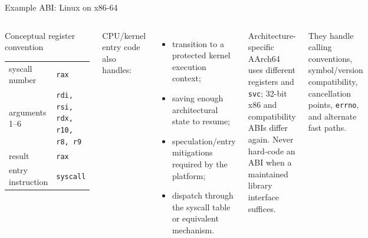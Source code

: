 \documentclass[aspectratio=169,11pt]{beamer}
\newcommand{\code}[1]{\texttt{#1}}
\begin{document}
\begin{frame}{Example ABI: Linux on x86-64}
  \begin{columns}[T,onlytextwidth]
      \begin{block}{Conceptual register convention}
        \begin{tabular}{@{}ll@{}}
          syscall number & \code{rax} \\
          arguments 1--6 & \code{rdi, rsi, rdx, r10, r8, r9} \\
          result & \code{rax} \\
          entry instruction & \code{syscall} \\
        \end{tabular}
      \end{block}
      CPU/kernel entry code also handles:
      \begin{itemize}
        \item transition to a protected kernel execution context;
        \item saving enough architectural state to resume;
        \item speculation/entry mitigations required by the platform;
        \item dispatch through the syscall table or equivalent mechanism.
      \end{itemize}
      \begin{alertblock}{Architecture-specific}
        AArch64 uses different registers and \code{svc}; 32-bit x86 and compatibility ABIs differ again. Never hard-code an ABI when a maintained library interface suffices.
      \end{alertblock}
      \begin{tcolorbox}[title=Why wrappers matter]
        They handle calling conventions, symbol/version compatibility, cancellation points, \code{errno}, and alternate fast paths.
      \end{tcolorbox}
  \end{columns}
\end{frame}
\end{document}

